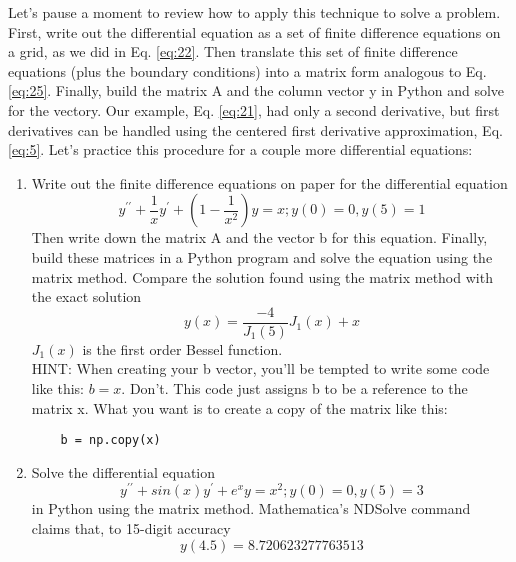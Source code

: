 Let\rq s pause a moment to review how to apply this technique to solve a problem. First, write out the differential equation as a set of finite difference equations on a grid, as we did in Eq. \ref{eq:22}. Then translate this set of finite difference equations (plus the boundary conditions) into a matrix form analogous to Eq. \ref{eq:25}. Finally, build the matrix A and the column vector y in Python and solve for the vectory. Our example, Eq. \ref{eq:21}, had only a second derivative, but first derivatives can be handled using the centered first derivative approximation, Eq. \ref{eq:5}. Let\rq s practice this procedure for a couple more differential equations:
\begin{problem} \label{P2.3}
	\begin{enumerate}[label=(\alph*)]
		\item Write out the finite difference equations on paper for the differential equation
		\begin{equation} \label{eq:26}
				y^{\prime\prime} + \frac{1}{x}y^\prime + (1 - \frac{1}{x^2})y=x ; y(0) = 0 , y(5) = 1
		\end{equation}
		Then write down the matrix A and the vector b for this equation. Finally, build these matrices in a Python program and solve the equation using the matrix method. Compare the solution found using the matrix method with the exact solution
		\begin{equation*}
			y(x) = \frac{-4}{J_1(5)}J_1(x)+x
		\end{equation*}
		$J_1(x)$ is the first order Bessel function.\\ HINT: When creating your b vector, you\rq ll be tempted to write some code like this: $b=x$. Don\rq t. This code just assigns b to be a reference to the matrix x. What you want is to create a copy of the matrix like this: \\ 
		\begin{lstlisting}	
	b = np.copy(x)
	\end{lstlisting}
	\item 	Solve the differential equation
	\begin{equation}\label{eq:27}
	y^{\prime\prime} + sin(x)y^\prime+e^xy=x^2 ; y(0) = 0, y(5)=3
\end{equation}		
	in Python using the matrix method. Mathematica\rq s NDSolve command claims that, to 15-digit accuracy
		\begin{equation*}
			y(4.5) = 8.720623277763513
		\end{equation*}


\end{enumerate}
\end{problem}
